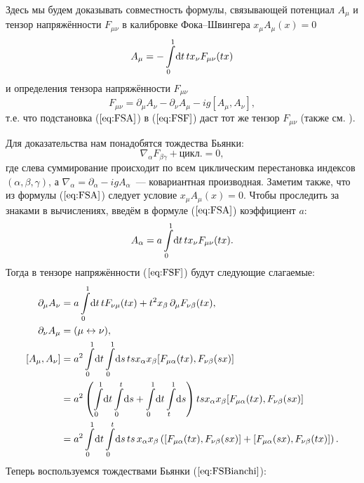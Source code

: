 
Здесь мы будем доказывать совместность формулы, связывающей потенциал $A_\mu$ и тензор напряжённости $F_{\mu \nu}$ в калибровке Фока--Швингера $x_\mu A_\mu(x) = 0$
\begin{equation}
	\label{eq:FSA}
	A_\mu = - \int\limits_0^1\!\mathrm{d} t\, tx_\nu F_{\mu \nu}(tx)
\end{equation}
и определения тензора напряжённости $F_{\mu \nu}$
\begin{equation}
	\label{eq:FSF}
	F_{\mu \nu}=\partial_\mu A_\nu - \partial_\nu A_\mu - ig [A_\mu, A_\nu],
\end{equation}
т.е. что подстановка ($\ref{eq:FSA}$) в ($\ref{eq:FSF}$) даст тот же тензор $F_{\mu \nu}$ (также см. \cite{Cronstrm1980}).

Для доказательства нам понадобятся тождества Бьянки:
\begin{equation}
	\label{eq:FSBianchi}
	\nabla_\alpha F_{\beta \gamma} + \text{цикл.} = 0,
\end{equation}
где слева суммирование происходит по всем циклическим перестановка индексов $(\alpha, \beta, \gamma)$, а $\nabla_\alpha=\partial_\alpha-igA_\alpha$~--- ковариантная производная. Заметим также, что из формулы ($\ref{eq:FSA}$) следует условие $x_\mu A_\mu(x) = 0$. Чтобы проследить за знаками в вычислениях, введём в формуле ($\ref{eq:FSA}$) коэффициент $a$:
\begin{equation*}
	A_\alpha = a \int\limits_0^1\!\mathrm{d} t\, tx_\nu F_{\mu \nu}(tx).
\end{equation*}
Тогда в тензоре напряжённости ($\ref{eq:FSF}$) будут следующие слагаемые:
\begin{align*}
	\partial_\mu A_\nu &= a \int\limits_0^1\!\D t\, t F_{\nu \mu}(tx) + t^2 x_\beta\, \partial_\mu F_{\nu \beta} (tx),\\
	\partial_\nu A_\mu &= (\mu \leftrightarrow \nu),\\
	[A_\mu, A_\nu] &= a^2 \int\limits_0^1\!\D t\int\limits_0^1\!\D s\, ts x_\alpha x_\beta [F_{\mu \alpha}(tx), F_{\nu \beta}(sx)]\\
	&=a^2 \left(\int\limits_0^1\!\D t\int\limits_0^t\!\D s+ \int\limits_0^1\!\D t\int\limits_t^1\!\D s\right)ts x_\alpha x_\beta [F_{\mu \alpha}(tx), F_{\nu \beta}(sx)]\\
	&= a^2 \int\limits_0^1\!\D t\int\limits_0^t\!\D s\, ts \,x_\alpha x_\beta \left([F_{\mu \alpha}(tx), F_{\nu \beta}(sx)] + [F_{\mu \alpha}(sx), F_{\nu \beta}(tx)]\right).
\end{align*}
Теперь воспользуемся тождествами Бьянки ($\ref{eq:FSBianchi}$):
